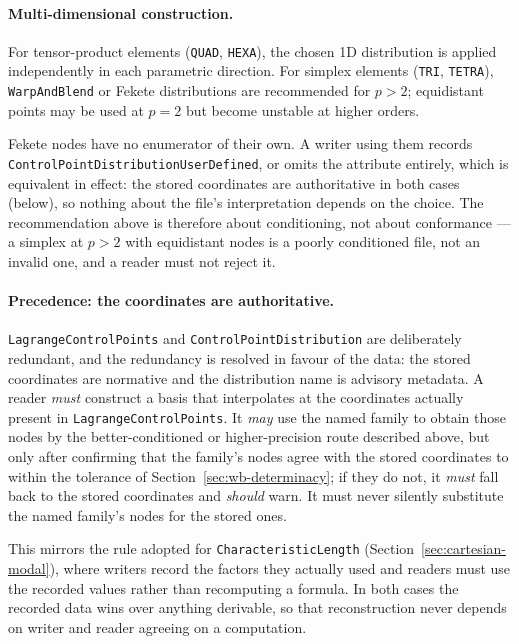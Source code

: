 \documentclass[11pt,letterpaper]{article}
\newif\ifvfourdraft
\newcommand{\vfour}[1]{\ifvfourdraft\textcolor{v4violet}{#1}\else#1\fi}
\begin{document}
\paragraph{Multi-dimensional construction.}
For tensor-product elements (\texttt{QUAD}, \texttt{HEXA}), the chosen 1D distribution is
applied independently in each parametric direction.  For simplex elements (\texttt{TRI},
\texttt{TETRA}), \texttt{WarpAndBlend} or Fekete distributions are recommended for $p>2$;
equidistant points may be used at $p=2$ but become unstable at higher orders.

\vfour{Fekete nodes have no enumerator of their own.  A writer using them records
\texttt{ControlPointDistributionUserDefined}, or omits the attribute entirely,
which is equivalent in effect: the stored coordinates are authoritative in both
cases (below), so nothing about the file's interpretation depends on the choice.
The recommendation above is therefore about conditioning, not about conformance
--- a simplex at $p>2$ with equidistant nodes is a poorly conditioned file, not
an invalid one, and a reader must not reject it.}

\paragraph{Precedence: the coordinates are authoritative.}
\texttt{LagrangeControlPoints} and \texttt{ControlPointDistribution} are
deliberately redundant, and the redundancy is resolved in favour of the data: the stored
coordinates are normative and the distribution name is advisory metadata.  A reader
\emph{must} construct a basis that interpolates at the coordinates actually present in
\texttt{LagrangeControlPoints}.  It \emph{may} use the named family to obtain those nodes by
the better-conditioned or higher-precision route described above, but only after confirming
that the family's nodes agree with the stored coordinates to within the tolerance
\vfour{of Section~\ref{sec:wb-determinacy}}; if
they do not, it \emph{must} fall back to the stored coordinates and \emph{should} warn.  It
must never silently substitute the named family's nodes for the stored ones.

This mirrors the rule adopted for \texttt{CharacteristicLength}
(Section~\ref{sec:cartesian-modal}), where writers record the factors they actually used and
readers must use the recorded values rather than recomputing a formula.  In both cases the
recorded data wins over anything derivable, so that reconstruction never depends on writer
and reader agreeing on a computation.
\end{document}
